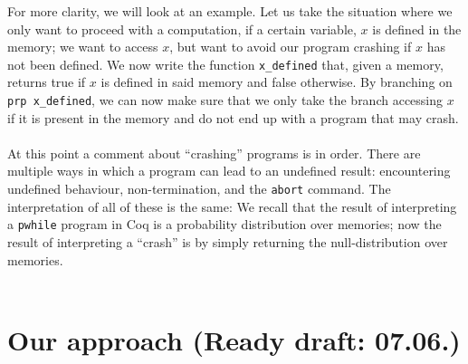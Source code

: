 \documentclass[11pt, leqno, titlepage]{article}
\theoremstyle{definition}
\begin{document}
For more clarity, we will look at an example. Let us take the situation where we only
want to proceed with a computation, if a certain variable, $x$ is defined in the
memory; we want to access $x$, but want to avoid our program crashing if $x$ has not
been defined. We now write the function \texttt{x\_defined} that, given a memory,
returns true if $x$ is defined in said memory and false otherwise. By branching on
\texttt{prp x\_defined}, we can now make sure that we only take the branch accessing
$x$ if it is present in the memory and do not end up with a program that may
crash. \\
\\
At this point a comment about ``crashing'' programs is in order. There are multiple
ways in which a program can lead to an undefined result: encountering undefined
behaviour, non-termination, and the \texttt{abort} command. The interpretation of all
of these is the same: We recall that the result of interpreting a \texttt{pwhile}
program in Coq is a probability distribution over memories; now the result of
interpreting a ``crash'' is by simply returning the null-distribution over memories.\\
\\


\section{Our approach (Ready draft: 07.06.)}\label{sec:approach}



\end{document}
